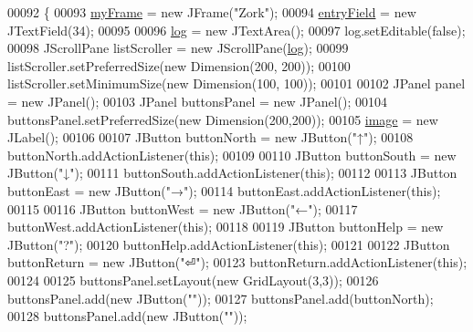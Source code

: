 \begin{DoxyCode}
00092                              \{
00093         \hyperlink{classUserInterface_a1bb844238b260f6d4ae1852b6b1e0b97}{myFrame} = \textcolor{keyword}{new} JFrame(\textcolor{stringliteral}{"Zork"});
00094         \hyperlink{classUserInterface_a940367d996e9e7ad6e1fa1abfe35128b}{entryField} = \textcolor{keyword}{new} JTextField(34);
00095 
00096         \hyperlink{classUserInterface_a7f6ed10812f99e2cc6ce5f497d8ba2a0}{log} = \textcolor{keyword}{new} JTextArea();
00097         log.setEditable(\textcolor{keyword}{false});
00098         JScrollPane listScroller = \textcolor{keyword}{new} JScrollPane(\hyperlink{classUserInterface_a7f6ed10812f99e2cc6ce5f497d8ba2a0}{log});
00099         listScroller.setPreferredSize(\textcolor{keyword}{new} Dimension(200, 200));
00100         listScroller.setMinimumSize(\textcolor{keyword}{new} Dimension(100, 100));
00101 
00102         JPanel panel = \textcolor{keyword}{new} JPanel();
00103         JPanel buttonsPanel = \textcolor{keyword}{new} JPanel();
00104         buttonsPanel.setPreferredSize(\textcolor{keyword}{new} Dimension(200,200));
00105         \hyperlink{classUserInterface_a0d115eb19b54f3e002ec6aa0fcfb1db4}{image} = \textcolor{keyword}{new} JLabel();
00106 
00107         JButton buttonNorth = \textcolor{keyword}{new} JButton(\textcolor{stringliteral}{"↑"});
00108         buttonNorth.addActionListener(\textcolor{keyword}{this});
00109 
00110         JButton buttonSouth = \textcolor{keyword}{new} JButton(\textcolor{stringliteral}{"↓"});
00111         buttonSouth.addActionListener(\textcolor{keyword}{this});
00112 
00113         JButton buttonEast = \textcolor{keyword}{new} JButton(\textcolor{stringliteral}{"→"});
00114         buttonEast.addActionListener(\textcolor{keyword}{this});
00115 
00116         JButton buttonWest = \textcolor{keyword}{new} JButton(\textcolor{stringliteral}{"←"});
00117         buttonWest.addActionListener(\textcolor{keyword}{this});
00118 
00119         JButton buttonHelp = \textcolor{keyword}{new} JButton(\textcolor{stringliteral}{"?"});
00120         buttonHelp.addActionListener(\textcolor{keyword}{this});
00121 
00122         JButton buttonReturn = \textcolor{keyword}{new} JButton(\textcolor{stringliteral}{"⏎"});
00123         buttonReturn.addActionListener(\textcolor{keyword}{this});
00124 
00125         buttonsPanel.setLayout(\textcolor{keyword}{new} GridLayout(3,3));
00126         buttonsPanel.add(\textcolor{keyword}{new} JButton(\textcolor{stringliteral}{""}));
00127         buttonsPanel.add(buttonNorth);
00128         buttonsPanel.add(\textcolor{keyword}{new} JButton(\textcolor{stringliteral}{""}));

\end{DoxyCode}
